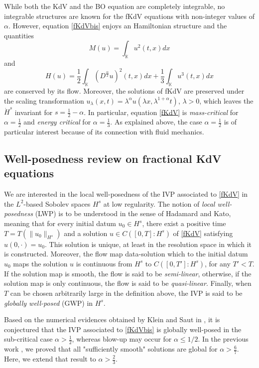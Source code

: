 \documentclass{amsart}
\theoremstyle{definition}
\theoremstyle{remark}
\numberwithin{equation}{section}
\begin{document}
While both the KdV and the BO equation are completely integrable, no integrable structures are known  for the fKdV equations with non-integer values of $\alpha$. However, equation \eqref{fKdVbis} enjoys an Hamiltonian structure and the quantities 
\begin{equation} \label{Mass}
M(u)=\int_{\mathbb K} u^2(t,x) dx
\end{equation}
and
\begin{equation} \label{MassEnergy}
H(u)=\frac12 \int_{\mathbb K} (D^{\frac{\alpha}2}u)^2(t,x)dx+\frac13 \int_{\mathbb K} u^3(t,x) dx 
\end{equation}
are conserved by its flow.
Moreover, the solutions of fKdV are preserved under the scaling transformation $u_{\lambda}(x,t)=\lambda^{\alpha}u(\lambda x,\lambda^{1+\alpha}t)$,  $\lambda>0$, which leaves the $\dot{H}^s$ invariant for $s=\frac12-\alpha$. In particular, equation \eqref{fKdV} is \emph{mass-critical} for $\alpha=\frac12$ and \emph{energy critical} for $\alpha=\frac13$. As explained above, the case $\alpha=\frac12$ is of particular interest because of its connection with fluid mechanics. 

\subsection{Well-posedness review on fractional KdV equations}

We are interested in the local well-posedness of the IVP associated to \eqref{fKdV} in the $L^2$-based Sobolev spaces $H^s$ at low regularity. The notion of \emph{local well-posedness} (LWP) is to be understood in the sense of Hadamard and Kato, meaning that for every initial datum $u_0 \in H^s$, there exist a positive time $T=T(\|u_0\|_{H^s})$ and a solution $u \in C([0,T] :  H^s)$ of \eqref{fKdV} satisfying $u(0,\cdot)=u_0$. This solution is unique, at least in the resolution space in which it is constructed. Moreover, the flow map data-solution which to the initial datum $u_0$ maps the solution $u$ is continuous from $H^s$ to $C([0,T'] : H^s)$, for any $T'<T$. If the solution map is smooth, the flow is said to be \emph{semi-linear}, otherwise, if the solution map is only continuous, the flow is said to be \emph{quasi-linear}. Finally, when $T$ can be chosen arbitrarily large in the definition above, the IVP is said to be \emph{globally well-posed} (GWP) in $H^s$. 

Based on the numerical evidences obtained by Klein and Saut in \cite{KlSa15}, it is conjectured that the IVP associated to \eqref{fKdVbis} is globally well-posed  in the sub-critical case $\alpha>\frac12$, whereas blow-up may occur for $ \alpha\le 1/2$. In the previous work \cite{MPV}, we proved that all "sufficiently  smooth" solutions are global  for $\alpha>\frac67$. Here, we extend that result to $\alpha>\frac23$.
\end{document}

